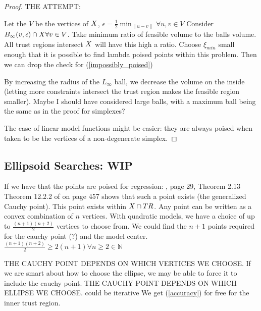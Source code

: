 \documentclass{article}
\let\oldref\ref
\renewcommand{\ref}[1]{(\oldref{#1})}
\begin{document}
\begin{proof}

THE ATTEMPT:

Let the $V$ be the vertices of $X$, $\epsilon = \frac 1 2 \min_{\|u - v\|} \forall u,v \in V$
Consider $B_{\infty}(v, \epsilon) \cap X \forall v \in V$.
Take minimum ratio of feasible volume to the balls volume.
\color{red}All trust regions intersect $X$ will have this high a ratio.\color{black}
Choose $\xi_{min}$ small enough that it is possible to find lambda poised points within this problem.
Then we can drop the check for \ref{impossibly_poised}

By increasing the radius of the $L_{\infty}$ ball, we decrease the volume on the inside (letting more constraints intersect the trust region makes the feasible region smaller).
Maybe I should have considered large balls, with a maximum ball being the same as in the proof for simplexes?

The case of linear model functions might be easier: they are always poised when taken to be the vertices of a non-degenerate simplex.

\end{proof}

\subsection{Ellipsoid Searches: WIP}

If we have that the points are poised for regression: \cite{DUMMY:intro_book}, page 29, Theorem 2.13
Theorem 12.2.2 of \cite{Conn:2000:TM:357813} on page 457 shows that such a point exists (the generalized Cauchy point).
This point exists within $X \cap TR$.
Any point can be written as a convex combination of $n$ vertices.
With quadratic models, we have a choice of up to $\frac{(n+1)(n+2)}{2}$ vertices to choose from.
We could find the $n+1$ points required for the cauchy point (?) and the model center.
$\frac{(n+1)(n+2)}{2} \ge 2(n+1)\forall n\ge 2 \in \mathbb N$

THE CAUCHY POINT DEPENDS ON WHICH VERTICES WE CHOOSE.
If we are smart about how to choose the ellipse, we may be able to force it to include the cauchy point.
THE CAUCHY POINT DEPENDS ON WHICH ELLIPSE WE CHOOSE.
could be iterative
We get \ref{accuracy} for free for the inner trust region.
\color{black}







\color{red}
\end{document}
